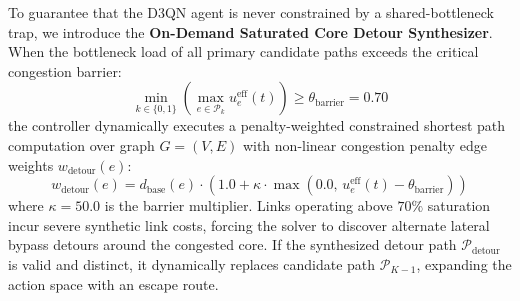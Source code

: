 \documentclass[12pt,a4paper,oneside]{report}
\begin{document}
To guarantee that the D3QN agent is never constrained by a shared-bottleneck trap, we introduce the \textbf{On-Demand Saturated Core Detour Synthesizer}. When the bottleneck load of all primary candidate paths exceeds the critical congestion barrier:
\begin{equation}
    \min_{k \in \{0, 1\}} \left( \max_{e \in \mathcal{P}_k} u_e^{\text{eff}}(t) \right) \ge \theta_{\text{barrier}} = 0.70
\end{equation}
the controller dynamically executes a penalty-weighted constrained shortest path computation over graph $G = (V, E)$ with non-linear congestion penalty edge weights $w_{\text{detour}}(e)$:
\begin{equation}
    w_{\text{detour}}(e) = d_{\text{base}}(e) \cdot \left( 1.0 + \kappa \cdot \max\left(0.0, \, u_e^{\text{eff}}(t) - \theta_{\text{barrier}}\right) \right)
\end{equation}
where $\kappa = 50.0$ is the barrier multiplier. Links operating above $70\%$ saturation incur severe synthetic link costs, forcing the solver to discover alternate lateral bypass detours around the congested core. If the synthesized detour path $\mathcal{P}_{\text{detour}}$ is valid and distinct, it dynamically replaces candidate path $\mathcal{P}_{K-1}$, expanding the action space with an escape route.
\end{document}
